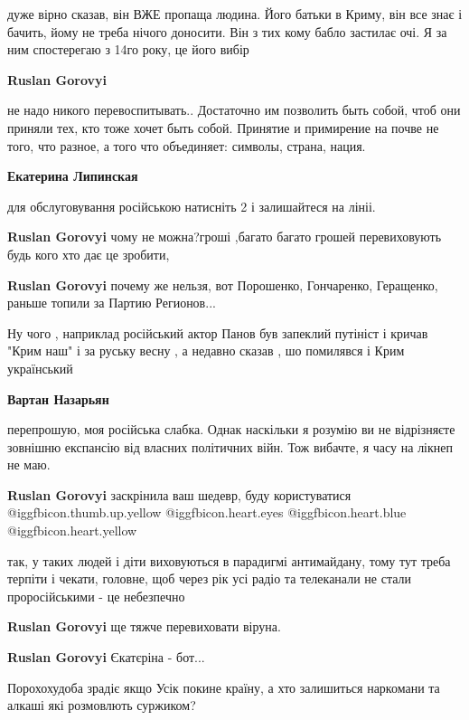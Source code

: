 \begin{itemize}
\begin{itemize}
дуже вірно сказав, він ВЖЕ пропаща людина. Його батьки в Криму, він все знає і
бачить, йому не треба нічого доносити. Він з тих кому бабло застилає очі. Я за
ним спостерегаю з 14го року, це його вибір

\textbf{Ruslan Gorovyi} 

не надо никого перевоспитывать.. Достаточно им позволить быть собой, чтоб они
приняли тех, кто тоже хочет быть собой. Принятие и примирение на почве не того,
что разное, а того что объединяет: символы, страна, нация.


\textbf{Екатерина Липинская} 

для обслуговування російською натисніть 2 і залишайтеся на лініі.

\textbf{Ruslan Gorovyi} чому не можна?гроші ,багато багато грошей перевиховують
будь кого хто дає це зробити,

\textbf{Ruslan Gorovyi} почему же нельзя, вот Порошенко, Гончаренко, Геращенко, раньше топили за Партию Регионов...


Ну чого , наприклад російський актор Панов був запеклий путініст і кричав "Крим
наш" і за руську весну , а недавно сказав , шо помилявся і Крим український



\textbf{Вартан Назарьян} 

перепрошую, моя російська слабка. Однак наскільки я розумію ви не відрізняєте
зовнішню експансію від власних політичних війн. Тож вибачте, я часу на лікнеп
не маю.

\textbf{Ruslan Gorovyi} заскрінила ваш шедевр, буду користуватися @igg{fbicon.thumb.up.yellow}  @igg{fbicon.heart.eyes}  @igg{fbicon.heart.blue}  @igg{fbicon.heart.yellow} 


так, у таких людей і діти виховуються в парадигмі антимайдану, тому тут треба
терпіти і чекати, головне, щоб через рік усі радіо та телеканали не стали
проросійськими - це небезпечно

\textbf{Ruslan Gorovyi} ще тяжче перевиховати віруна.

\textbf{Ruslan Gorovyi} Єкатєріна - бот...

Порохохудоба зрадіє якщо Усік покине країну, а хто залишиться наркомани та алкаші які розмовлють суржиком?


\end{itemize}
\end{itemize}
